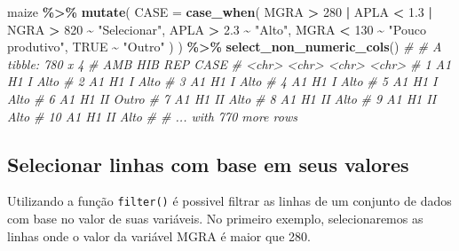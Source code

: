\documentclass[
]{book}
\makeatletter
\newenvironment{Shaded}{\begin{snugshade}}{\end{snugshade}}
\newcommand{\CommentTok}[1]{\textcolor[rgb]{0.56,0.35,0.01}{\textit{#1}}}
\newcommand{\DataTypeTok}[1]{\textcolor[rgb]{0.13,0.29,0.53}{#1}}
\newcommand{\DecValTok}[1]{\textcolor[rgb]{0.00,0.00,0.81}{#1}}
\newcommand{\FloatTok}[1]{\textcolor[rgb]{0.00,0.00,0.81}{#1}}
\newcommand{\KeywordTok}[1]{\textcolor[rgb]{0.13,0.29,0.53}{\textbf{#1}}}
\newcommand{\NormalTok}[1]{#1}
\newcommand{\OperatorTok}[1]{\textcolor[rgb]{0.81,0.36,0.00}{\textbf{#1}}}
\newcommand{\OtherTok}[1]{\textcolor[rgb]{0.56,0.35,0.01}{#1}}
\newcommand{\StringTok}[1]{\textcolor[rgb]{0.31,0.60,0.02}{#1}}
\numberwithin{equation}{section}
\newcommand{\indf}[1]{\index[function]{#1@\texttt{#1()}|ST}}
\makeatother
\begin{document}
\begin{Shaded}
\begin{Highlighting}[]

\NormalTok{maize }\OperatorTok{\%\textgreater{}\%}\StringTok{ }
\StringTok{  }\KeywordTok{mutate}\NormalTok{(}
    \DataTypeTok{CASE =} \KeywordTok{case\_when}\NormalTok{(}
\NormalTok{      MGRA }\OperatorTok{\textgreater{}}\StringTok{ }\DecValTok{280} \OperatorTok{|}\StringTok{ }\NormalTok{APLA }\OperatorTok{\textless{}}\StringTok{ }\FloatTok{1.3} \OperatorTok{|}\StringTok{ }\NormalTok{NGRA }\OperatorTok{\textgreater{}}\StringTok{ }\DecValTok{820} \OperatorTok{\textasciitilde{}}\StringTok{  "Selecionar"}\NormalTok{,}
\NormalTok{      APLA }\OperatorTok{\textgreater{}}\StringTok{ }\FloatTok{2.3} \OperatorTok{\textasciitilde{}}\StringTok{ "Alto"}\NormalTok{,}
\NormalTok{      MGRA }\OperatorTok{\textless{}}\StringTok{ }\DecValTok{130} \OperatorTok{\textasciitilde{}}\StringTok{ "Pouco produtivo"}\NormalTok{,}
      \OtherTok{TRUE} \OperatorTok{\textasciitilde{}}\StringTok{ "Outro"}
\NormalTok{    )}
\NormalTok{  ) }\OperatorTok{\%\textgreater{}\%}\StringTok{ }
\StringTok{  }\KeywordTok{select\_non\_numeric\_cols}\NormalTok{()}
\CommentTok{\# \# A tibble: 780 x 4}
\CommentTok{\#    AMB   HIB   REP   CASE }
\CommentTok{\#    \textless{}chr\textgreater{} \textless{}chr\textgreater{} \textless{}chr\textgreater{} \textless{}chr\textgreater{}}
\CommentTok{\#  1 A1    H1    I     Alto }
\CommentTok{\#  2 A1    H1    I     Alto }
\CommentTok{\#  3 A1    H1    I     Alto }
\CommentTok{\#  4 A1    H1    I     Alto }
\CommentTok{\#  5 A1    H1    I     Alto }
\CommentTok{\#  6 A1    H1    II    Outro}
\CommentTok{\#  7 A1    H1    II    Alto }
\CommentTok{\#  8 A1    H1    II    Alto }
\CommentTok{\#  9 A1    H1    II    Alto }
\CommentTok{\# 10 A1    H1    II    Alto }
\CommentTok{\# \# ... with 770 more rows}
\end{Highlighting}
\end{Shaded}

\hypertarget{selecionar-linhas-com-base-em-seus-valores}{%
\subsection{Selecionar linhas com base em seus valores}\label{selecionar-linhas-com-base-em-seus-valores}}

Utilizando a função \texttt{filter()} \indf{filter} é possivel filtrar as linhas de um conjunto de dados com base no valor de suas variáveis. No primeiro exemplo, selecionaremos as linhas onde o valor da variável MGRA é maior que 280.
\end{document}
